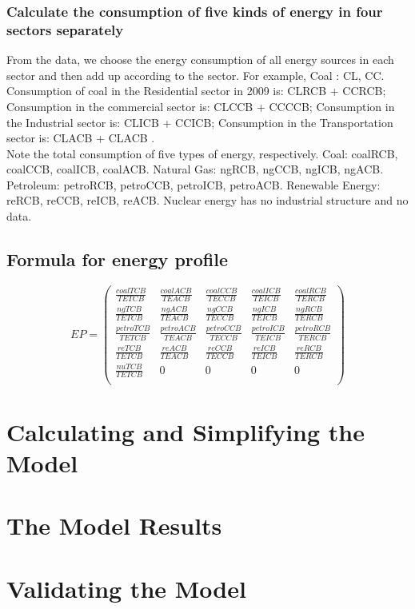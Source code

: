 \documentclass{mcmthesis}
\begin{document}
\subsubsection{Calculate the consumption of five kinds of energy in four sectors separately}
From the data, we choose the energy consumption of all energy sources in each sector and then add up according to the sector.
  For example, Coal : CL, CC. Consumption of coal in the Residential sector in 2009 is: CLRCB + CCRCB; Consumption in the commercial sector is: CLCCB + CCCCB; Consumption in the Industrial sector is: CLICB + CCICB; Consumption in the Transportation sector is: CLACB + CLACB .\\
Note the total consumption of five types of energy, respectively. Coal: coalRCB, coalCCB, coalICB, coalACB. Natural Gas: ngRCB, ngCCB, ngICB, ngACB. Petroleum: petroRCB, petroCCB, petroICB, petroACB. Renewable Energy: reRCB, reCCB, reICB, reACB. Nuclear energy has no industrial structure and no data.
\subsection{Formula for energy profile}
\[
  EP =
  \begin{pmatrix}
  \frac{coalTCB}{TETCB} & \frac{coalACB}{TEACB} & \frac{coalCCB}{TECCB} & \frac{coalICB}{TEICB} & \frac{coalRCB}{TERCB}  \\
  \frac{ngTCB}{TETCB} & \frac{ngACB}{TEACB} & \frac{ngCCB}{TECCB} & \frac{ngICB}{TEICB} & \frac{ngRCB}{TERCB} \\
  \frac{petroTCB}{TETCB} & \frac{petroACB}{TEACB} & \frac{petroCCB}{TECCB} & \frac{petroICB}{TEICB} & \frac{petroRCB}{TERCB} \\
  \frac{reTCB}{TETCB} & \frac{reACB}{TEACB} & \frac{reCCB}{TECCB} & \frac{reICB}{TEICB} & \frac{reRCB}{TERCB} \\
  \frac{nuTCB}{TETCB} & 0 & 0 & 0 & 0\\
  \end{pmatrix}
\]
\section{Calculating and Simplifying the Model }
\section{The Model Results}
\section{Validating the Model}
\end{document}
